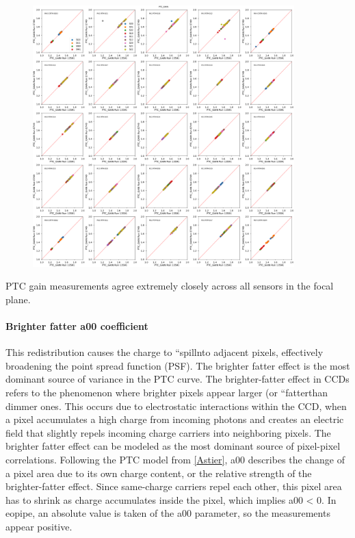 \begin{figure}
\begin{centering}
\includegraphics[width=0.9\textwidth]{sections/figures/baselineCharacterization/13591_E749_PTC_GAIN.png}
\end{centering}
\end{figure}

PTC gain measurements agree extremely closely across all sensors in the
focal plane.

\paragraph{\texorpdfstring{Brighter fatter a{00}
coefficient}{Brighter fatter a00 coefficient}}\label{brighter-fatter-a00-coefficient}

This redistribution causes the charge to ``spillnto adjacent pixels,
effectively broadening the point spread function (PSF). The brighter
fatter effect is the most dominant source of variance in the PTC curve.
The brighter-fatter effect in CCDs refers to the phenomenon where
brighter pixels appear larger (or ``fatterthan dimmer ones. This occurs
due to electrostatic interactions within the CCD, when a pixel
accumulates a high charge from incoming photons and creates an electric
field that slightly repels incoming charge carriers into neighboring
pixels. The brighter fatter effect can be modeled as the most dominant
source of pixel-pixel correlations. Following the PTC model from
\hyperref[Astier]{{[}Astier{]}}, a00 describes the change of a pixel
area due to its own charge content, or the relative strength of the
brighter-fatter effect. Since same-charge carriers repel each other,
this pixel area has to shrink as charge accumulates inside the pixel,
which implies a00 \textless{} 0. In eo\label{pipe}{pipe},
an absolute value is taken of the a{00} parameter, so the measurements
appear positive.

